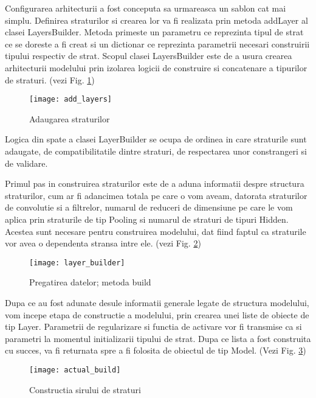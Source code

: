 	Configurarea arhitecturii a fost conceputa sa urmareasca un sablon cat mai simplu. Definirea straturilor si crearea lor va fi realizata prin metoda addLayer al clasei LayersBuilder. Metoda primeste un parametru ce reprezinta tipul de strat ce se doreste a fi creat si un dictionar ce reprezinta parametrii necesari construirii tipului respectiv de strat. Scopul clasei LayersBuilder este de a usura crearea arhitecturii modelului prin izolarea logicii de construire si concatenare a tipurilor de straturi. (vezi Fig. \ref{fig:add_layers})	
	
	\begin{figure}[H]
		\texttt{[image: add\_layers]}
		\caption{\label{fig:add_layers} Adaugarea straturilor}
	\end{figure}

	Logica din spate a clasei LayerBuilder se ocupa de ordinea in care straturile sunt adaugate, de  compatibilitatile dintre straturi, de respectarea unor constrangeri si de validare.
	
	Primul pas in construirea straturilor este de a aduna informatii despre structura straturilor, cum ar fi adancimea totala pe care o vom aveam, datorata straturilor de convolutie si a filtrelor,  numarul de reduceri de dimensiune pe care le vom aplica prin straturile de tip Pooling si numarul de straturi de tipuri Hidden. Acestea sunt necesare pentru construirea modelului, dat fiind faptul ca straturile vor avea o dependenta stransa intre ele.  (vezi Fig. \ref{fig:layer_builder})
	
	\begin{figure}[H]
		\texttt{[image: layer\_builder]}
		\caption{\label{fig:layer_builder} Pregatirea datelor; metoda build}
	\end{figure}
	
	\vfill
	

	Dupa ce au fost adunate desule informatii generale legate de structura modelului, vom incepe etapa de constructie a modelului, prin crearea unei liste de obiecte de tip Layer. Parametrii de regularizare si functia de activare vor fi transmise ca si parametri la momentul initializarii tipului de strat. Dupa ce lista a fost construita cu succes,  va fi returnata spre a fi folosita de obiectul de tip Model. (Vezi Fig. \ref{fig:actual_build})
	
	
	\begin{figure}[H]
		\texttt{[image: actual\_build]}
		\caption{\label{fig:actual_build} Constructia sirului de straturi}
	\end{figure}

